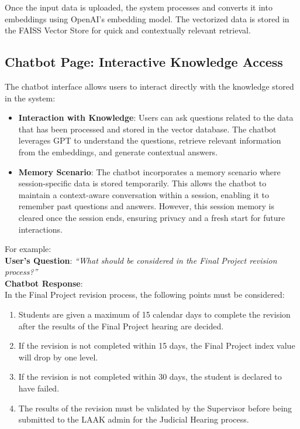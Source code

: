 \documentclass[runningheads]{llncs}
\begin{document}
Once the input data is uploaded, the system processes and converts it into embeddings using OpenAI's embedding model. The vectorized data is stored in the FAISS Vector Store for quick and contextually relevant retrieval.

\subsection{Chatbot Page: Interactive Knowledge Access}
The chatbot interface allows users to interact directly with the knowledge stored in the system:
\begin{itemize}
    \item \textbf{Interaction with Knowledge}: Users can ask questions related to the data that has been processed and stored in the vector database. The chatbot leverages GPT to understand the questions, retrieve relevant information from the embeddings, and generate contextual answers.
    \item \textbf{Memory Scenario}: The chatbot incorporates a memory scenario where session-specific data is stored temporarily. This allows the chatbot to maintain a context-aware conversation within a session, enabling it to remember past questions and answers. However, this session memory is cleared once the session ends, ensuring privacy and a fresh start for future interactions.
\end{itemize}

For example: \\
\textbf{User's Question}: \textit{``What should be considered in the Final Project revision process?''} \\

\textbf{Chatbot Response}: \\
In the Final Project revision process, the following points must be considered:
\begin{enumerate}
    \item Students are given a maximum of 15 calendar days to complete the revision after the results of the Final Project hearing are decided.
    \item If the revision is not completed within 15 days, the Final Project index value will drop by one level.
    \item If the revision is not completed within 30 days, the student is declared to have failed.
    \item The results of the revision must be validated by the Supervisor before being submitted to the LAAK admin for the Judicial Hearing process.
\end{enumerate}
\end{document}

